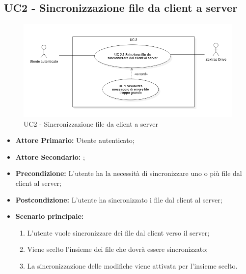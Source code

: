 \subsection{UC2 - Sincronizzazione file da client a server}
\begin{figure}[H]
    \centering
    \includegraphics[scale = 0.6]{components/img/UC2.png}
    \caption{UC2 - Sincronizzazione file da client a server}
\end{figure}
\begin{itemize}
\item \textbf{Attore Primario:} Utente autenticato;
\item \textbf{Attore Secondario:} ;
\item \textbf{Precondizione:} L'utente ha la necessità di sincronizzare uno o più file dal client al server;
\item \textbf{Postcondizione:} L'utente ha sincronizzato i file dal client al server;
\item \textbf{Scenario principale:}
\begin{enumerate}
\item L'utente vuole sincronizzare dei file dal client verso il server;
\item Viene scelto l'insieme dei file che dovrà essere sincronizzato;
\item La sincronizzazione delle modifiche viene attivata per l'insieme scelto.
\end{enumerate}
\end{itemize}
